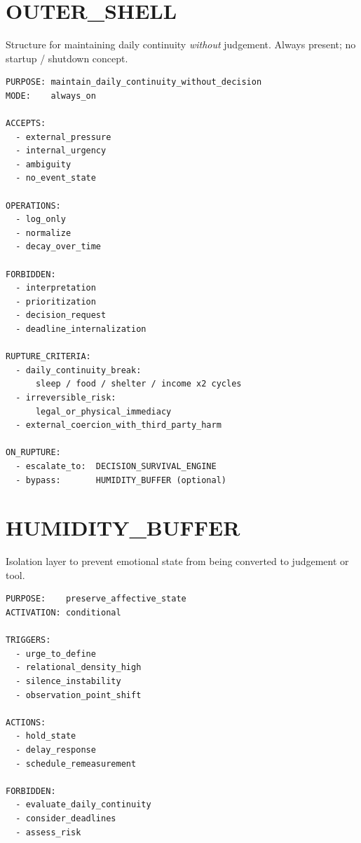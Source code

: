 \section{OUTER\_SHELL}
\label{sec:limit-outer-shell}

Structure for maintaining daily continuity \emph{without} judgement.
Always present; no startup / shutdown concept.

\begin{lstlisting}[basicstyle=\ttfamily\small,frame=single]
PURPOSE: maintain_daily_continuity_without_decision
MODE:    always_on

ACCEPTS:
  - external_pressure
  - internal_urgency
  - ambiguity
  - no_event_state

OPERATIONS:
  - log_only
  - normalize
  - decay_over_time

FORBIDDEN:
  - interpretation
  - prioritization
  - decision_request
  - deadline_internalization

RUPTURE_CRITERIA:
  - daily_continuity_break:
      sleep / food / shelter / income x2 cycles
  - irreversible_risk:
      legal_or_physical_immediacy
  - external_coercion_with_third_party_harm

ON_RUPTURE:
  - escalate_to:  DECISION_SURVIVAL_ENGINE
  - bypass:       HUMIDITY_BUFFER (optional)
\end{lstlisting}

\section{HUMIDITY\_BUFFER}
\label{sec:limit-humidity-buffer}

Isolation layer to prevent emotional state from being converted to
judgement or tool.

\begin{lstlisting}[basicstyle=\ttfamily\small,frame=single]
PURPOSE:    preserve_affective_state
ACTIVATION: conditional

TRIGGERS:
  - urge_to_define
  - relational_density_high
  - silence_instability
  - observation_point_shift

ACTIONS:
  - hold_state
  - delay_response
  - schedule_remeasurement

FORBIDDEN:
  - evaluate_daily_continuity
  - consider_deadlines
  - assess_risk
\end{lstlisting}

